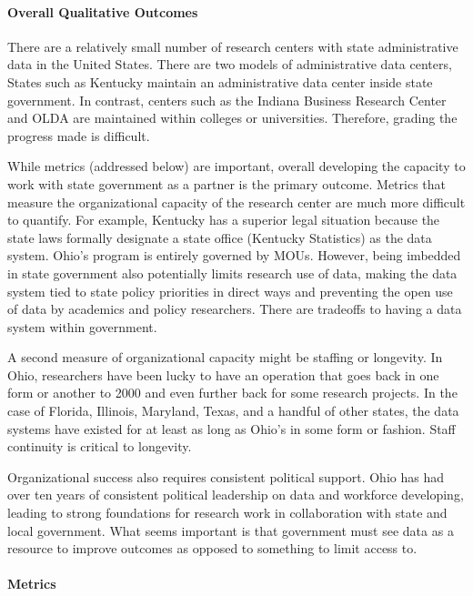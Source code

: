 \documentclass[
]{WileySix}
\begin{document}
\hypertarget{overall-qualitative-outcomes}{%
\paragraph{Overall Qualitative Outcomes}\label{overall-qualitative-outcomes}}

There are a relatively small number of research centers with state administrative data in the United States. There are two models of administrative data centers, States such as Kentucky maintain an administrative data center inside state government. In contrast, centers such as the Indiana Business Research Center and OLDA are maintained within colleges or universities. Therefore, grading the progress made is difficult.

While metrics (addressed below) are important, overall developing the capacity to work with state government as a partner is the primary outcome. Metrics that measure the organizational capacity of the research center are much more difficult to quantify. For example, Kentucky has a superior legal situation because the state laws formally designate a state office (Kentucky Statistics) as the data system. Ohio's program is entirely governed by MOUs. However, being imbedded in state government also potentially limits research use of data, making the data system tied to state policy priorities in direct ways and preventing the open use of data by academics and policy researchers. There are tradeoffs to having a data system within government.

A second measure of organizational capacity might be staffing or longevity. In Ohio, researchers have been lucky to have an operation that goes back in one form or another to 2000 and even further back for some research projects. In the case of Florida, Illinois, Maryland, Texas, and a handful of other states, the data systems have existed for at least as long as Ohio's in some form or fashion. Staff continuity is critical to longevity.

Organizational success also requires consistent political support. Ohio has had over ten years of consistent political leadership on data and workforce developing, leading to strong foundations for research work in collaboration with state and local government. What seems important is that government must see data as a resource to improve outcomes as opposed to something to limit access to.

\hypertarget{metrics-1}{%
\paragraph{Metrics}\label{metrics-1}}
\end{document}
